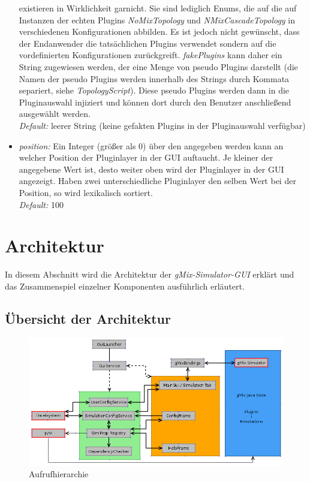 \documentclass[a4paper, 11pt]{article} %
\begin{document}
\begin{itemize}
	existieren in Wirklichkeit garnicht. Sie sind lediglich Enums, die auf die auf Instanzen der echten Plugins \emph{NoMixTopology} und \emph{NMixCascadeTopology} in verschiedenen Konfigurationen abbilden. Es ist jedoch nicht gewünscht, dass der Endanwender die tatsächlichen Plugins verwendet sondern auf die vordefinierten Konfigurationen zurückgreift. \emph{fakePlugins} kann daher ein String zugewiesen werden, der eine Menge von pseudo Plugins darstellt (die Namen der pseudo Plugins werden innerhalb des Strings durch Kommata separiert, siehe \emph{TopologyScript}). Diese pseudo Plugins werden dann in die Pluginauswahl injiziert und können dort durch den Benutzer anschließend ausgewählt werden.\\
	\emph{Default:} leerer String (keine gefakten Plugins in der Pluginauswahl verfügbar)
	\item \emph{position:}
	Ein Integer (größer als 0) über den angegeben werden kann an welcher Position der Pluginlayer in der GUI auftaucht. Je kleiner der angegebene Wert ist, desto weiter oben wird der Pluginlayer in der GUI angezeigt. Haben zwei unterschiedliche Pluginlayer den selben Wert bei der Position, so wird lexikalisch sortiert.\\
	\emph{Default:} 100 
\end{itemize}

\section{Architektur} %
\label{sec:architektur}
In diesem Abschnitt wird die Architektur der \emph{gMix-Simulator-GUI} erklärt und das Zusammenspiel einzelner Komponenten ausführlich erläutert. 

\subsection{Übersicht der Architektur} %
\label{ssub:uebersicht}

\begin{figure}[!htp]
\includegraphics[width=\textwidth]{img/arch.png}
\caption{Aufrufhierarchie}
\label{fig:callgraph}
\end{figure}
\end{document}
